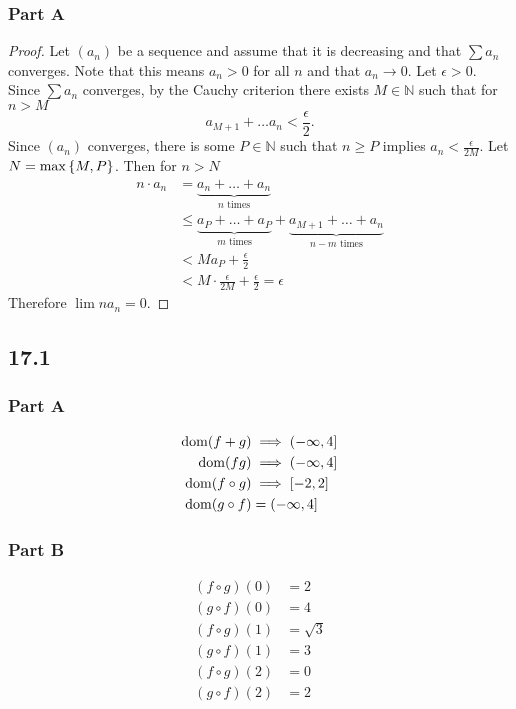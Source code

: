 \documentclass[12pt,titlepage]{extarticle}
\begin{document}
\subsubsection*{Part A}
\begin{proof}
    Let $(a_n)$ be a sequence and assume that it is decreasing and that $\sum a_n$ converges. Note that this means $a_n > 0$ for all $n$ and that $a_n \to 0$. Let $\epsilon > 0$. Since $\sum a_n$ converges, by the Cauchy criterion there exists $M \in \mathbb{N}$ such that for $n > M$
    \[
        a_{M + 1} + \ldots a_n < \frac{\epsilon}{2}
    .\]
    Since $(a_n)$ converges, there is some $P \in \mathbb{N}$ such that $n \geq P$ implies $a_n < \frac{\epsilon}{2M}$. Let $N = \max\qty{M, P}$. Then for $n > N$
    \begin{align*}
        n \cdot a_n &= \underbrace{a_n + \ldots + a_n}_{n \text{ times}} \\
                    &\leq \underbrace{a_P + \ldots + a_P}_{m \text{ times}} + \underbrace{a_{M + 1} + \ldots + a_n}_{n - m \text{ times}} \\
                    &< M a_P + \frac{\epsilon}{2} \\
                    &< M \cdot \frac{\epsilon}{2M} + \frac{\epsilon}{2} = \epsilon
    \end{align*}
    Therefore $\lim n a_n = 0$.
\end{proof}

\subsection*{17.1}
\subsubsection*{Part A}
\begin{align*}
    \operatorname{dom}(f+g) &\implies (-\infty, 4] \\
    \operatorname{dom}(fg) &\implies (-\infty, 4] \\
    \operatorname{dom}(f \circ g) &\implies [-2, 2] \\
    \operatorname{dom}(g \circ f) &= (-\infty, 4]
\end{align*}

\subsubsection*{Part B}
\begin{align*}
    (f\circ g)(0) &= 2 \\
    (g \circ f)(0) &= 4 \\
    (f\circ g)(1) &= \sqrt{3} \\
    (g \circ f)(1) &= 3 \\
    (f\circ g)(2) &= 0 \\
    (g \circ f)(2) &= 2 \\
\end{align*}
\end{document}
